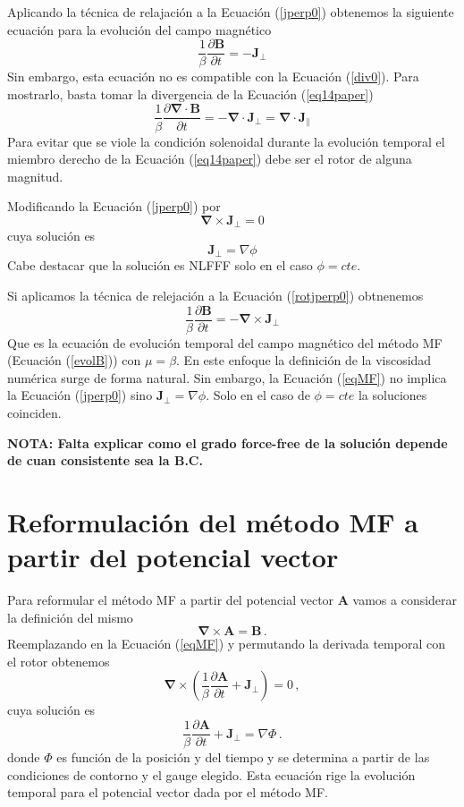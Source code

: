 \documentclass[a4paper,10pt]{article}
\def\bB{{\boldsymbol{B}}}
\def\bA{{\boldsymbol{A}}}
\def\bJ{{\boldsymbol{J}}}
\def\rot{\boldsymbol{\nabla \times}}
\def\div{\boldsymbol{\nabla \cdot}}
\def\dt#1{\frac{\partial #1}{\partial t}}
\def\nota#1{{\bf NOTA: #1}}
\def\eq#1{Ecuación (\ref{#1})}
\def\jperp{\bJ_\perp}
\begin{document}
Aplicando la técnica de relajación a la \eq{jperp0} obtenemos la siguiente ecuación para la evolución del campo magnético
\begin{equation}
 \frac{1}{\beta}\dt{\bB} = - \jperp \label{eq14paper}
\end{equation}
Sin embargo, esta ecuación no es compatible con la \eq{div0}. Para mostrarlo, basta tomar la divergencia de la \eq{eq14paper}
\begin{equation}
  \frac{1}{\beta}\dt{\div \bB} = - \div \jperp = \div \bJ_\parallel
\end{equation}
Para evitar que se viole la condición solenoidal durante la evolución temporal el miembro derecho de la \eq{eq14paper} debe ser el rotor de alguna magnitud.

Modificando la \eq{jperp0} por 
\begin{equation}
 \rot \jperp = 0 \label{rotjperp0}
\end{equation}
cuya solución es
\begin{equation}
 \jperp = \nabla \phi
 \label{def_phi}
\end{equation}
Cabe destacar que la solución es NLFFF solo en el caso $\phi=cte$.

Si aplicamos la técnica de relejación a la \eq{rotjperp0} obtnenemos
\begin{equation}
 \frac{1}{\beta}\dt{\bB} = - \rot \jperp \label{eqMF}
\end{equation}
Que es la ecuación de evolución temporal del campo magnético del método MF (\eq{evolB}) con $\mu=\beta$. En este enfoque la definición de la viscosidad numérica surge de forma natural. Sin embargo, la \eq{eqMF} no implica la \eq{jperp0} sino $\jperp= \nabla \phi$. Solo en el caso de $\phi=cte$ la soluciones coinciden. 

\nota{Falta explicar como el grado force-free de la solución depende de cuan consistente sea la B.C.}

\section{Reformulación del método MF a partir del potencial vector}

Para reformular el método MF a partir del potencial vector $\bA$ vamos a considerar la definición del mismo
\begin{equation}
 \rot \bA = \bB \,.
\end{equation}
Reemplazando en la \eq{eqMF} y permutando la derivada temporal con el rotor obtenemos
\begin{equation}
 \rot \left(\frac{1}{\beta} \dt{\bA}+\jperp\right)= 0 \,,
\end{equation}
cuya solución es
\begin{equation}
  \frac{1}{\beta} \dt{\bA} + \jperp = \nabla \Phi \,.
  \label{MF_potvec}
 \end{equation}
donde $\Phi$ es función de la posición y del tiempo y se determina a partir de las condiciones de contorno y el gauge elegido. Esta ecuación rige la evolución temporal para el potencial vector dada por el método MF.  
\end{document}
